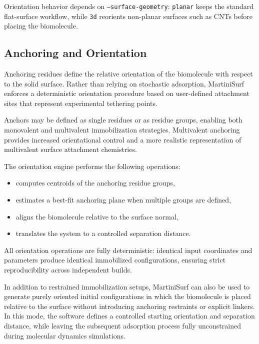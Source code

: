 \documentclass[11pt]{article}
\begin{document}
Orientation behavior depends on \texttt{--surface-geometry}:
\texttt{planar} keeps the standard flat-surface workflow, while
\texttt{3d} reorients non-planar surfaces such as CNTs before placing
the biomolecule.

\subsection{Anchoring and Orientation}

Anchoring residues define the relative orientation of the biomolecule with respect
to the solid surface. Rather than relying on stochastic adsorption,
MartiniSurf enforces a deterministic orientation procedure based on
user-defined attachment sites that represent experimental tethering points.

Anchors may be defined as single residues or as residue groups,
enabling both monovalent and multivalent immobilization strategies.
Multivalent anchoring provides increased orientational control and
a more realistic representation of multivalent surface attachment chemistries.

The orientation engine performs the following operations:

\begin{itemize}
  \item computes centroids of the anchoring residue groups,
  \item estimates a best-fit anchoring plane when multiple groups are defined,
  \item aligns the biomolecule relative to the surface normal,
  \item translates the system to a controlled separation distance.
\end{itemize}

All orientation operations are fully deterministic: identical input
coordinates and parameters produce identical immobilized configurations,
ensuring strict reproducibility across independent builds.

In addition to restrained immobilization setups, MartiniSurf can also be used to generate purely oriented initial configurations in which the biomolecule is placed relative to the surface without introducing anchoring restraints or explicit linkers. In this mode, the software defines a controlled starting orientation and separation distance, while leaving the subsequent adsorption process fully unconstrained during molecular dynamics simulations.
\end{document}
